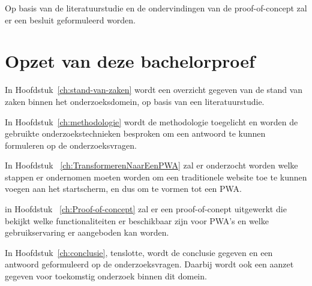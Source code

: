 	Op basis van de literatuurstudie en de ondervindingen van de proof-of-concept zal er een besluit geformuleerd worden.
	
\section{Opzet van deze bachelorproef}

	In Hoofdstuk~\ref{ch:stand-van-zaken} wordt een overzicht gegeven van de stand van zaken binnen het onderzoeksdomein, op basis van een literatuurstudie.
	
	In Hoofdstuk~\ref{ch:methodologie} wordt de methodologie toegelicht en worden de gebruikte onderzoekstechnieken besproken om een antwoord te kunnen formuleren op de onderzoeksvragen.
	
	In Hoofdstuk ~\ref{ch:TransformerenNaarEenPWA} zal er onderzocht worden welke stappen er ondernomen moeten worden om een traditionele website toe te kunnen voegen aan het startscherm, en dus om te vormen tot een PWA.
	
	in Hoofdstuk ~\ref{ch:Proof-of-concept} zal er een proof-of-conept uitgewerkt die bekijkt welke functionaliteiten er beschikbaar zijn voor PWA's en welke gebruikservaring er aangeboden kan worden.
	
	In Hoofdstuk~\ref{ch:conclusie}, tenslotte, wordt de conclusie gegeven en een antwoord geformuleerd op de onderzoeksvragen. Daarbij wordt ook een aanzet gegeven voor toekomstig onderzoek binnen dit domein.
	






